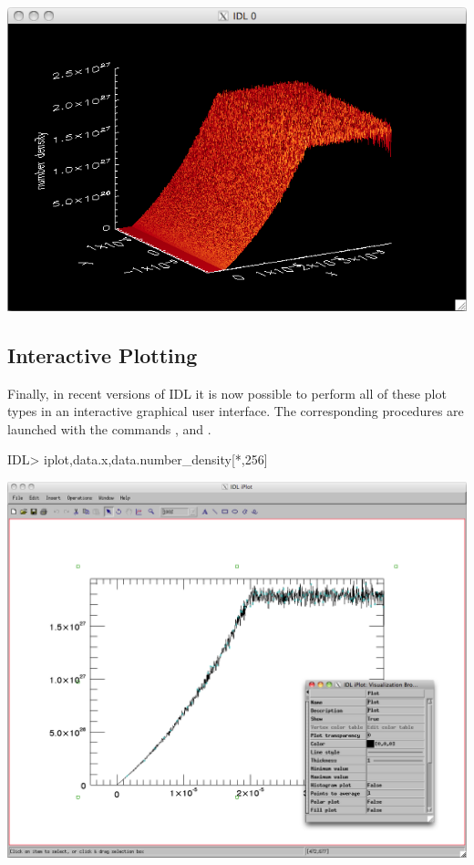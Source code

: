   \begin{center}
    \includegraphics[width=0.8\linewidth]{images/idl_shade_surf}
  \end{center}

\subsection{Interactive Plotting}
  Finally, in recent versions of IDL it is now possible to perform all of
  these plot types in an interactive graphical user interface. The corresponding
  procedures are launched with the commands , 
  and .

\begin{boxverbatim}
IDL> iplot,data.x,data.number_density[*,256]
\end{boxverbatim}
  \begin{center}
    \includegraphics[width=0.8\linewidth]{images/idl_iplot}
  \end{center}

